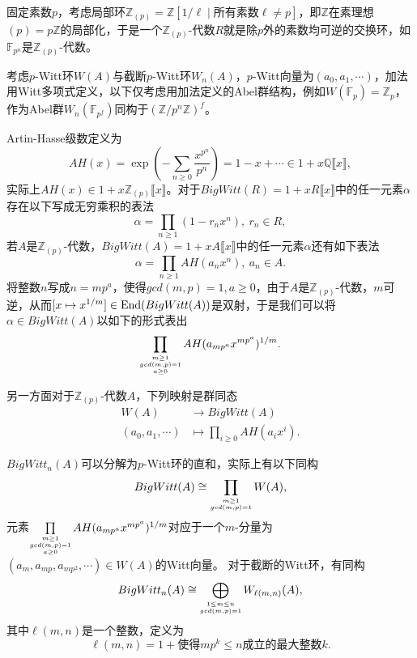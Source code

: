 固定素数$p$，考虑局部环$\mathbb{Z}_{(p)}=\mathbb{Z}[1/\ell \mid \text{所有素数}\ell\neq p]$，即$\mathbb{Z}$在素理想$(p)=p \mathbb{Z}$的局部化，于是一个$\mathbb{Z}_{(p)}$-代数$R$就是除$p$外的素数均可逆的交换环，如$\mathbb{F}_{p^n}$是$\mathbb{Z}_{(p)}$-代数。

考虑$p$-Witt环$W(A)$与截断$p$-Witt环$W_n(A)$，$p$-Witt向量为$(a_0,a_1,\cdots)$，加法用Witt多项式定义，以下仅考虑用加法定义的Abel群结构，例如$W(\mathbb{F}_p)=\mathbb{Z}_{p}$，作为Abel群$W_n(\mathbb{F}_{p^f})$同构于$(\mathbb{Z}/p^n\mathbb{Z})^f$。%

Artin-Hasse级数定义为
\[AH(x)= \exp(-\sum_{n\geq 0}\frac{x^{p^n}}{p^n})=1-x+\cdots \in 1+x \mathbb{Q}\llbracket x\rrbracket ,\]
实际上$AH(x)\in 1+x \mathbb{Z}_{(p)}\llbracket x\rrbracket $。对于$BigWitt(R)=1+xR\llbracket x\rrbracket $中的任一元素$\alpha$存在以下写成无穷乘积的表法
\[\alpha = \prod_{n\geq 1}(1-r_nx^n),\ r_n\in R,\]
若$A$是$\mathbb{Z}_{(p)}$-代数，$BigWitt(A)=1+xA\llbracket x\rrbracket $中的任一元素$\alpha$还有如下表法
\[\alpha = \prod_{n\geq 1}AH(a_n x^n),\ a_n\in A.\]
将整数$n$写成$n=mp^a$，使得$gcd(m,p)=1, a\geq 0$，由于$A$是$\mathbb{Z}_{(p)}$-代数，$m$可逆，从而$[x\mapsto x^{1/m}]\in \mathrm{End}(BigWitt(A))$是双射，于是我们可以将$\alpha\in BigWitt(A)$以如下的形式表出
\[\prod_{\scriptsize\substack{m\geq 1 \\ gcd(m,p)=1  \\ a\geq 0}}AH(a_{mp^a} x^{mp^a})^{1/m}.\]

另一方面对于$\mathbb{Z}_{(p)}$-代数$A$，下列映射是群同态
\begin{align*}
W(A)&\longrightarrow BigWitt(A)\\
(a_0,a_1,\cdots) &\mapsto \prod_{i\geq 0}AH(a_i x^i).
\end{align*}

$BigWitt_n(A)$可以分解为$p$-Witt环的直和，实际上有以下同构
\[
BigWitt(A) \cong \prod_{\scriptsize\substack{m\geq 1 \\ gcd(m,p)=1}} W(A),
\]
元素$\prod\limits_{\scriptsize\substack{m\geq 1 \\ gcd(m,p)=1  \\ a\geq 0}}AH(a_{mp^a} x^{mp^a})^{1/m}$对应于一个$m$-分量为$(a_m,a_{mp},a_{mp^2},\cdots)\in W(A)$的Witt向量。
对于截断的Witt环，有同构\[
BigWitt_n(A) \cong \bigoplus_{\scriptsize\substack{1\leq m\leq n \\ gcd(m,p)=1}} W_{\ell(m,n)}(A),
\]
其中$\ell(m,n)$是一个整数，定义为
\[\ell(m,n)=1+\text{使得$mp^k\leq n$成立的最大整数$k$}.\]

